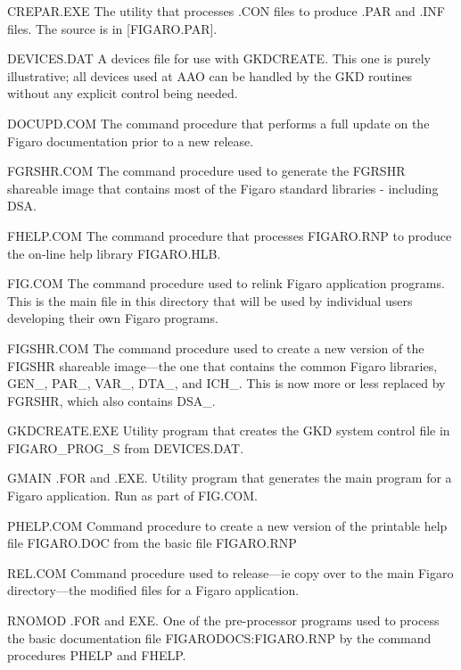 \begin{description}
\item CREPAR.EXE The utility that processes .CON files to produce .PAR and
.INF files.  The source is in [FIGARO.PAR].

\item DEVICES.DAT A devices file for use with GKDCREATE. This one is purely
illustrative; all devices used at AAO can be handled by the GKD routines
without any explicit control being needed.

\item DOCUPD.COM The command procedure that performs a full update on the
Figaro documentation prior to a new release.

\item FGRSHR.COM The command procedure used to generate the FGRSHR shareable
image that contains most of the Figaro standard libraries - including DSA.

\item FHELP.COM The command procedure that  processes FIGARO.RNP to
produce the on-line help library FIGARO.HLB.

\item FIG.COM The command procedure used to relink Figaro application
programs. This is the main file in this directory that will be used by
individual users developing their own Figaro programs.

\item FIGSHR.COM The command procedure used to create a new version of the
FIGSHR shareable image---the one that contains the common Figaro
libraries, GEN\_, PAR\_, VAR\_, DTA\_, and ICH\_. This is now more or
less replaced by FGRSHR, which also contains DSA\_.

\item GKDCREATE.EXE Utility program that creates the GKD system control file
in FIGARO\_\-PROG\_S from DEVICES.DAT.

\item GMAIN .FOR and .EXE. Utility program that generates the main program
for a Figaro application. Run as part of FIG.COM.

\item PHELP.COM Command procedure to create a new version of the printable
help file FIGARO.DOC from the basic file FIGARO.RNP

\item REL.COM Command procedure used to release---ie copy over to the main
Figaro directory---the modified files for a Figaro application.

\item RNOMOD .FOR and EXE. One of the pre-processor programs used to
process the basic documentation file FIGARODOCS:FIGARO.RNP by the command
procedures PHELP and FHELP.

\end{description}

